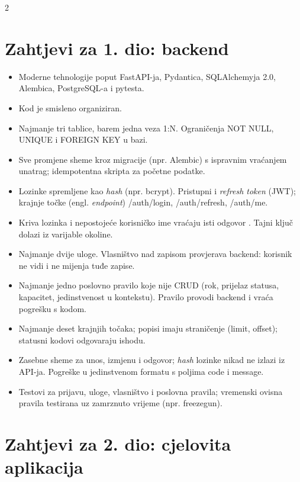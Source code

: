 \documentclass[10pt,a4paper]{article}
\newcommand{\code}[1]{{\ttfamily #1}}
\begin{document}
\begin{multicols}{2}\raggedright
\section{Zahtjevi za 1. dio: backend}

\begin{itemize}
  \item Moderne tehnologije poput FastAPI-ja, Pydantica, SQLAlchemyja 2.0, Alembica, PostgreSQL-a i pytesta.
  \item Kod je smisleno organiziran.
  \item Najmanje tri tablice, barem jedna veza 1:N. Ograničenja \code{NOT NULL}, \code{UNIQUE} i \code{FOREIGN KEY} u bazi.
  \item Sve promjene sheme kroz migracije (npr. Alembic) s ispravnim vraćanjem unatrag; idempotentna skripta za početne podatke.
  \item Lozinke spremljene kao \emph{hash} (npr. bcrypt). Pristupni i \emph{refresh token} (JWT); krajnje točke (engl. \emph{endpoint}) \code{/auth/login}, \code{/auth/refresh}, \code{/auth/me}.
  \item Kriva lozinka i nepostojeće korisničko ime vraćaju isti odgovor \code{401}. Tajni ključ dolazi iz varijable okoline.
  \item Najmanje dvije uloge. Vlasništvo nad zapisom provjerava backend: korisnik ne vidi i ne mijenja tuđe zapise.
  \item Najmanje jedno poslovno pravilo koje nije CRUD (rok, prijelaz statusa, kapacitet, jedinstvenost u kontekstu). Pravilo provodi backend i vraća pogrešku s kodom.
  \item Najmanje deset krajnjih točaka; popisi imaju straničenje (\code{limit}, \code{offset}); statusni kodovi odgovaraju ishodu.
  \item Zasebne sheme za unos, izmjenu i odgovor; \emph{hash} lozinke nikad ne izlazi iz API-ja. Pogreške u jedinstvenom formatu s poljima \code{code} i \code{message}.
  \item Testovi za prijavu, uloge, vlasništvo i poslovna pravila; vremenski ovisna pravila testirana uz zamrznuto vrijeme (npr. \code{freezegun}).
\end{itemize}

\columnbreak
\section{Zahtjevi za 2. dio: cjelovita aplikacija}


\end{multicols}
\end{document}
